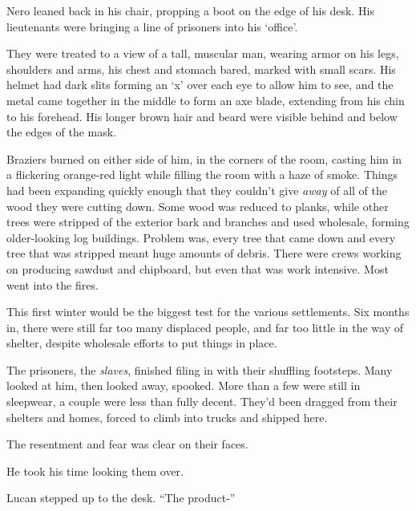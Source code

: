 





Nero leaned back in his chair, propping a boot on the edge of his desk.  His lieutenants were bringing a line of prisoners into his `office'.



They were treated to a view of a tall, muscular man, wearing armor on his legs, shoulders and arms, his chest and stomach bared, marked with small scars.  His helmet had dark slits forming an `x' over each eye to allow him to see, and the metal came together in the middle to form an axe blade, extending from his chin to his forehead.  His longer brown hair and beard were visible behind and below the edges of the mask.



Braziers burned on either side of him, in the corners of the room, casting him in a flickering orange-red light while filling the room with a haze of smoke.  Things had been expanding quickly enough that they couldn't give \emph{away} of all of the wood they were cutting down.  Some wood was reduced to planks, while other trees were stripped of the exterior bark and branches and used wholesale, forming older-looking log buildings.  Problem was, every tree that came down and every tree that was stripped meant huge amounts of debris.  There were crews working on producing sawdust and chipboard, but even that was work intensive.  Most went into the fires.



This first winter would be the biggest test for the various settlements.  Six months in, there were still far too many displaced people, and far too little in the way of shelter, despite wholesale efforts to put things in place.



The prisoners, the \emph{slaves}, finished filing in with their shuffling footsteps.  Many looked at him, then looked away, spooked.  More than a few were still in sleepwear, a couple were less than fully decent.  They'd been dragged from their shelters and homes, forced to climb into trucks and shipped here.



The resentment and fear was clear on their faces.



He took his time looking them over.



Lucan stepped up to the desk.  ``The product-''



